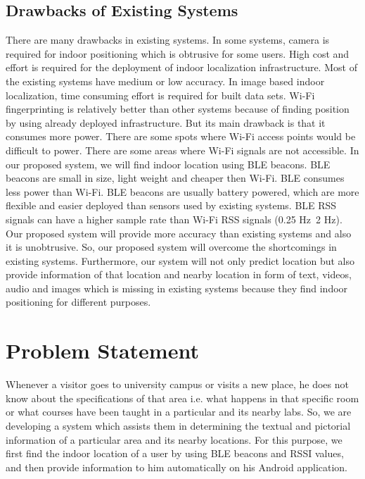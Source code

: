 \documentclass{article}
\begin{document}
\subsection{Drawbacks of Existing Systems}
There are many drawbacks in existing systems. In some systems, camera is required for indoor positioning which is obtrusive for some users. High cost and effort is required for the deployment of indoor localization infrastructure. Most of the existing systems have medium or low accuracy. In image based indoor localization, time consuming effort is required for built data sets. Wi-Fi fingerprinting is relatively better than other systems because of finding position by using already deployed infrastructure. But its main drawback is that it consumes more power. There are some spots where Wi-Fi access points would be difficult to power. There are some areas where Wi-Fi signals are not accessible. In our proposed system, we will find indoor location using BLE beacons. BLE beacons are small in size, light weight and cheaper then Wi-Fi. BLE consumes less power than Wi-Fi. BLE beacons are usually battery powered, which are more flexible and easier deployed than sensors used by existing systems. BLE RSS signals can have a higher sample rate than Wi-Fi RSS signals (0.25 Hz~2 Hz). Our proposed system will provide more accuracy than existing systems and also it is unobtrusive. So, our proposed system will overcome the shortcomings in existing systems. Furthermore, our system will not only predict location but also provide information of that location and nearby location in form of text, videos, audio and images which is missing in existing systems because they find indoor positioning for different purposes\cite{zhuang2016smartphone}.

\section{Problem Statement}
Whenever a visitor goes to university campus or visits a new place, he does not know about the specifications of that area i.e. what happens in that specific room or what courses have been taught in a particular and its nearby labs. So, we are developing a system which assists them in determining the textual and pictorial information of a particular area and its nearby locations. For this purpose, we first find the indoor location of a user by using BLE beacons and RSSI values, and then provide information to him automatically on his Android application. 
\end{document}
